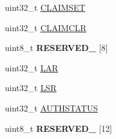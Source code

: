 \begin{DoxyCompactItemize}
\item 
uint32\+\_\+t \hyperlink{struct_e_t_f___mem_map_a044d760d7129c74de25a8f82ea1b4624}{C\+L\+A\+I\+M\+S\+E\+T}
\item 
uint32\+\_\+t \hyperlink{struct_e_t_f___mem_map_a91788605a9f984b8e1a998b4f9b0b606}{C\+L\+A\+I\+M\+C\+L\+R}
\item 
\hypertarget{struct_e_t_f___mem_map_aaa7818d738601566aed457d81951ccd3}{}uint8\+\_\+t {\bfseries R\+E\+S\+E\+R\+V\+E\+D\+\_} \mbox{[}8\mbox{]}\label{struct_e_t_f___mem_map_aaa7818d738601566aed457d81951ccd3}

\item 
uint32\+\_\+t \hyperlink{struct_e_t_f___mem_map_ac5caea67f9fed40ab8f183954f6401a8}{L\+A\+R}
\item 
uint32\+\_\+t \hyperlink{struct_e_t_f___mem_map_a404d7b7ce01537cb61bbb7c2d2ec1de5}{L\+S\+R}
\item 
uint32\+\_\+t \hyperlink{struct_e_t_f___mem_map_ae403364ae54b1eb918a559349465a7a8}{A\+U\+T\+H\+S\+T\+A\+T\+U\+S}
\item 
\hypertarget{struct_e_t_f___mem_map_a5b494470b3e1b4ce74b9ed148cb14358}{}uint8\+\_\+t {\bfseries R\+E\+S\+E\+R\+V\+E\+D\+\_} \mbox{[}12\mbox{]}\label{struct_e_t_f___mem_map_a5b494470b3e1b4ce74b9ed148cb14358}


\end{DoxyCompactItemize}
